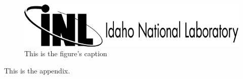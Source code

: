 \documentclass[12pt]{INLreport}
\begin{document}
\begin{figure}[hbtp!]
  \centering
  \includegraphics[width=\textwidth]{inl-left_black}
  \caption{This is the figure's caption}
  \label{thefigure}
\end{figure}

\clearpage
\appendix
This is the appendix.

\clearpage
{} %



\printindex

\begin{INLdistribution}

  \bigskip

\end{INLdistribution}
\end{document}
